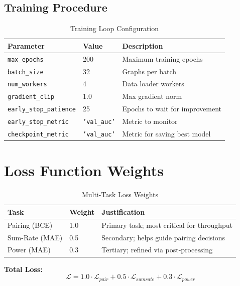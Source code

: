 \subsection{Training Procedure}

\begin{table}[H]
\centering
\begin{tabular}{llp{7cm}}
\toprule
\textbf{Parameter} & \textbf{Value} & \textbf{Description} \\
\midrule
\texttt{max\_epochs} & 200 & Maximum training epochs \\
\texttt{batch\_size} & 32 & Graphs per batch \\
\texttt{num\_workers} & 4 & Data loader workers \\
\texttt{gradient\_clip} & 1.0 & Max gradient norm \\
\texttt{early\_stop\_patience} & 25 & Epochs to wait for improvement \\
\texttt{early\_stop\_metric} & \texttt{'val\_auc'} & Metric to monitor \\
\texttt{checkpoint\_metric} & \texttt{'val\_auc'} & Metric for saving best model \\
\bottomrule
\end{tabular}
\caption{Training Loop Configuration}
\end{table}

\section{Loss Function Weights}

\begin{table}[H]
\centering
\begin{tabular}{llp{7cm}}
\toprule
\textbf{Task} & \textbf{Weight} & \textbf{Justification} \\
\midrule
Pairing (BCE) & 1.0 & Primary task; most critical for throughput \\
Sum-Rate (MAE) & 0.5 & Secondary; helps guide pairing decisions \\
Power (MAE) & 0.3 & Tertiary; refined via post-processing \\
\bottomrule
\end{tabular}
\caption{Multi-Task Loss Weights}
\end{table}

\textbf{Total Loss:}
\begin{equation}
\mathcal{L} = 1.0 \cdot \mathcal{L}_{pair} + 0.5 \cdot \mathcal{L}_{sumrate} + 0.3 \cdot \mathcal{L}_{power}
\end{equation}

